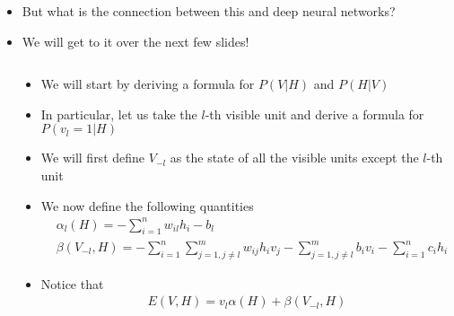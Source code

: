 \begin{frame}
\end{frame}

\begin{frame}
	\begin{block}{}
		\begin{itemize}
			\item  But what is the connection between this and deep neural networks?
			\item We will get to it over the next few slides!
		\end{itemize}
	\end{block}
\end{frame}

\begin{frame}
	\begin{columns}
		\begin{overlayarea}{\textwidth}{\textheight}
			
		\end{overlayarea}
		\begin{overlayarea}{\textwidth}{\textheight}
			\footnotesize{
				\begin{itemize}\justifying
					\item<1-> We will start by deriving a formula for $P(V|H)$ and $P(H|V)$
					\item<2-> In particular, let us take the $l$-th visible unit and derive a formula for $P(v_l=1|H)$
					\item<3-> We will first define $V_{-l}$ as the state of all the visible units except the $l$-th unit
					\item<4-> We now define the following quantities
					\begin{align*}
						&\alpha_l(H) = -\sum_{i=1}^n w_{il}h_i - b_l\\
						&\beta(V_{-l}, H) = -\sum_{i=1}^n \sum_{j=1,j\neq l}^m w_{ij} h_i v_j - \sum_{j=1,j\neq l}^m b_i v_i -\sum_{i=1}^n c_i h_i 
					\end{align*}
					\item<5-> Notice that
					\begin{align*}
						E(V,H) = v_l \alpha(H) + \beta(V_{-l},H)
					\end{align*} 
				\end{itemize}
			}
		\end{overlayarea}
	\end{columns}
\end{frame}

